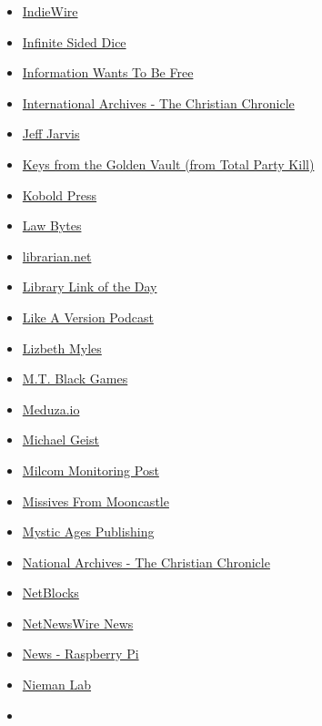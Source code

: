 \begin{itemize}
\item
  \href{https://www.indiewire.com/}{IndieWire}
\item
  \href{https://infinitesideddice.com/}{Infinite Sided Dice}
\item
  \href{https://meredith.wolfwater.com/wordpress}{Information Wants To
  Be Free}
\item
  \href{https://christianchronicle.org/category/news/international/}{International
  Archives - The Christian Chronicle}
\item
  \href{https://buzzmachine.com/}{Jeff Jarvis}
\item
  \href{https://www.theincomparable.com/tpk/keys/}{Keys from the Golden
  Vault (from Total Party Kill)}
\item
  \href{https://midgardmap.koboldpress.com/}{Kobold Press}
\item
  \href{http://www.michaelgeist.ca}{Law Bytes}
\item
  \href{https://www.librarian.net/}{librarian.net}
\item
  \href{https://www.tk421.net/librarylink/}{Library Link of the Day}
\item
  \href{https://www.abc.net.au/triplej/programs/like-a-version-podcast/}{Like
  A Version Podcast}
\item
  \href{https://lmmyles.com/}{Lizbeth Myles}
\item
  \href{https://www.mtblackgames.com/blog/}{M.T. Black Games}
\item
  \href{https://meduza.io/}{Meduza.io}
\item
  \href{https://www.michaelgeist.ca/}{Michael Geist}
\item
  \href{http://mt-milcom.blogspot.com/}{Milcom Monitoring Post}
\item
  \href{https://missivesfrommooncastle.blogspot.com/}{Missives From
  Mooncastle}
\item
  \href{https://mysticages.com/}{Mystic Ages Publishing}
\item
  \href{https://christianchronicle.org/category/news/national/}{National
  Archives - The Christian Chronicle}
\item
  \href{https://netblocks.org/}{NetBlocks}
\item
  \href{https://netnewswire.blog/}{NetNewsWire News}
\item
  \href{https://www.raspberrypi.com/news/}{News - Raspberry Pi}
\item
  \href{https://www.niemanlab.org/}{Nieman Lab}
\item

\end{itemize}
